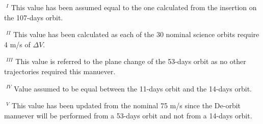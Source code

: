 $\;^{I}$ This value has been assumed equal to the one calculated from the insertion on the 107-days orbit. 

$\;^{II}$ This value has been calculated as each of the 30 nominal science orbits require 4 m/s of $\Delta V$.

$\;^{III}$ This value is referred to the plane change of the 53-days orbit as no other trajectories required this manuever. 

$\;^{IV}$ Value assumed to be equal between the 11-days orbit and the 14-days orbit. 

$\;^{V}$ This value has been updated from the nominal 75 m/s since the De-orbit manuever will be performed from a 53-days orbit and not from a 14-days orbit. 

